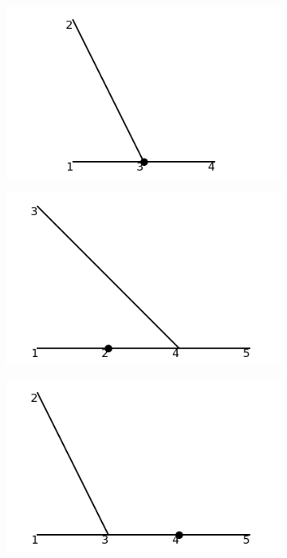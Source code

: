 \documentclass[11pt,a4paper,twoside,pdf]{article}
\numberwithin{equation}{section}
\begin{document}
\begin{figure}[h!]
    \centering
    \begin{subfigure}[t]{0.24\textwidth}
        \centering
        \includegraphics[width=\textwidth]{plots/order3/order3_1to2/counterterms/1.png}
        \caption{ }
    \end{subfigure}%
    \hfill
    \begin{subfigure}[t]{0.24\textwidth}
        \centering
        \includegraphics[width=\textwidth]{plots/order3/order3_1to2/counterterms/2.png}
        \caption{ }
    \end{subfigure}
    \hfill
    \begin{subfigure}[t]{0.24\textwidth}
        \centering
        \includegraphics[width=\textwidth]{plots/order3/order3_1to2/counterterms/3.png}

\end{subfigure}
\end{figure}
\end{document}
